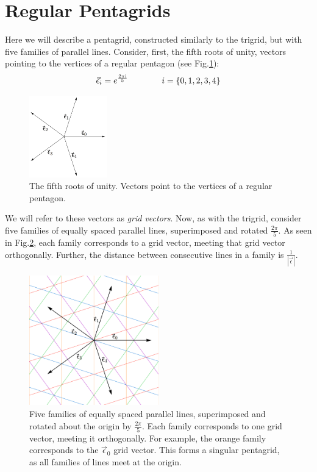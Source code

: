 \documentclass[
  oneside,
  11pt, a4paper,
  footinclude=true,
  headinclude=true,
  cleardoublepage=empty
]{scrbook}
\begin{document}
\section{Regular Pentagrids}
Here we will describe a pentagrid, constructed similarly to the trigrid, but with five families of parallel lines. Consider, first, the fifth roots of unity, vectors pointing to the vertices of a regular pentagon (see Fig.\ref{fig:rootsunity}):
\begin{equation*}
\vec{\epsilon}_i= e^{\frac{2 \pi \mathrm{i}}{5}} \qquad \qquad i=\{0,1,2,3,4\}\\
\end{equation*}
\begin{figure}[H]
\centering
\includegraphics[width=0.3\textwidth]{RootsUnity}
\caption[Fifth Roots of Unity]{The fifth roots of unity. Vectors point to the vertices of a regular pentagon.}
\label{fig:rootsunity}
\end{figure}

We will refer to these vectors as \textit{grid vectors}. Now, as with the trigrid, consider five families of equally spaced parallel lines, superimposed and rotated $\frac{2\pi}{5}$. As seen in Fig.\ref{fig:singularpentagrid}, each family corresponds to a grid vector, meeting that grid vector orthogonally. Further, the distance between consecutive lines in a family is $\frac{1}{|\vec{\epsilon}|}$.
\begin{figure}[H]
\centering
\includegraphics[width=0.5\textwidth]{SingularPentagrid}
\caption[Singular Pentagrid]{Five families of equally spaced parallel lines, superimposed and rotated about the origin by $\frac{2\pi}{5}$. Each family corresponds to one grid vector, meeting it orthogonally. For example, the orange family corresponds to the $\vec{\epsilon}_0$ grid vector. This forms a singular pentagrid, as all families of lines meet at the origin.}
\label{fig:singularpentagrid}
\end{figure}
\end{document}
